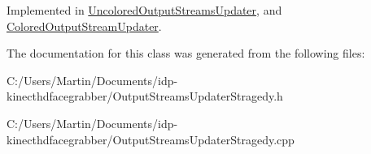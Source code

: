 Implemented in \hyperlink{class_uncolored_output_streams_updater_a0066f3f764858f63d29a72f215f4cf5e}{Uncolored\+Output\+Streams\+Updater}, and \hyperlink{class_colored_output_stream_updater_a5fde62c28b46d9113c06f9b317097797}{Colored\+Output\+Stream\+Updater}.



The documentation for this class was generated from the following files\+:\begin{DoxyCompactItemize}
\item 
C\+:/\+Users/\+Martin/\+Documents/idp-\/kinecthdfacegrabber/Output\+Streams\+Updater\+Stragedy.\+h\item 
C\+:/\+Users/\+Martin/\+Documents/idp-\/kinecthdfacegrabber/Output\+Streams\+Updater\+Stragedy.\+cpp\end{DoxyCompactItemize}
